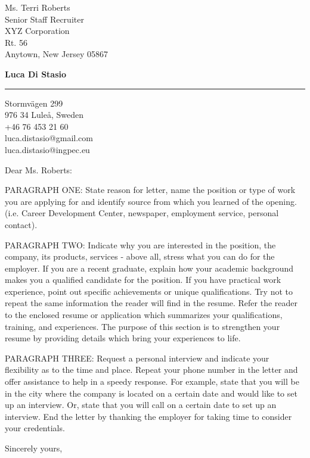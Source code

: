 \documentclass{letter} %
\begin{document}
\signature{Luca Di Stasio}           %
\longindentation=0pt                       %
\let\raggedleft\raggedright                %
 
 
\begin{letter}{Ms. Terri Roberts \\
Senior Staff Recruiter \\
XYZ Corporation \\
Rt. 56 \\
Anytown, New Jersey 05867}


\begin{flushleft}
{\large\bf Luca Di Stasio}
\end{flushleft}
\medskip\hrule height 1pt
\begin{flushright}
\hfill Stormv\"agen 299\\
\hfill 976 34 Lule\aa, Sweden\\
\hfill +46 76 453 21 60\\
\hfill luca.distasio@gmail.com\\
\hfill luca.distasio@ingpec.eu\\ 
\end{flushright} 
\vfill %

 
\opening{Dear Ms. Roberts:} 
 
\noindent PARAGRAPH ONE: State reason for letter, name the position or type 
of work you are applying for and identify source from  which  you 
learned   of   the  opening.  (i.e.  Career  Development  Center, 
newspaper, employment service, personal contact). 
 
\noindent PARAGRAPH  TWO:  Indicate why you are interested in the position, 
the company, its products, services - above all, stress what  you 
can  do  for  the employer. If you are a recent graduate, explain 
how your academic background makes you a qualified candidate  for 
the  position.  If  you have practical work experience, point out 
specific achievements or unique qualifications. Try not to repeat 
the  same  information  the reader will find in the resume. Refer 
the reader to the enclosed resume or application which summarizes 
your  qualifications,  training,  and experiences. The purpose of 
this section is to strengthen your resume  by  providing  details 
which bring your experiences to life. 
 
\noindent PARAGRAPH THREE: Request a personal interview and  indicate  your 
flexibility as to the time and place. Repeat your phone number in 
the letter and offer assistance to help in a speedy response. For 
example,  state that you will be in the city where the company is 
located on a certain date and would like to set up an  interview. 
Or,  state  that  you  will  call  on a certain date to set up an 
interview. End the letter by thanking  the  employer  for  taking 
time to consider your credentials. 
 
\closing{Sincerely yours,} 
 

 
\encl{}  				%

\end{letter}
 
\end{document}
